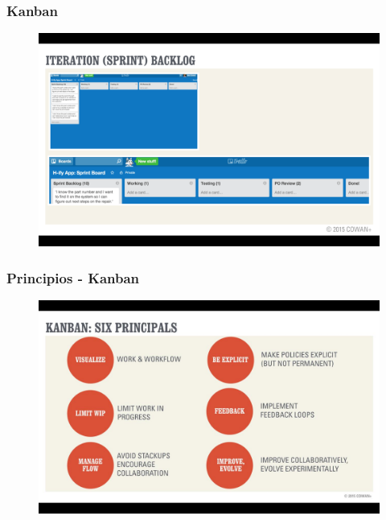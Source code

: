 \begin{frame}
 \frametitle{Kanban}
  \begin{figure}
   \centering
   \includegraphics[width = \textwidth]{figs/kanban1.png}
  \end{figure}
\end{frame}

\begin{frame}
 \frametitle{Principios - Kanban}
  \begin{figure}
   \centering
   \includegraphics[width = \textwidth]{figs/kanban_principios.png}
  \end{figure}
\end{frame}


